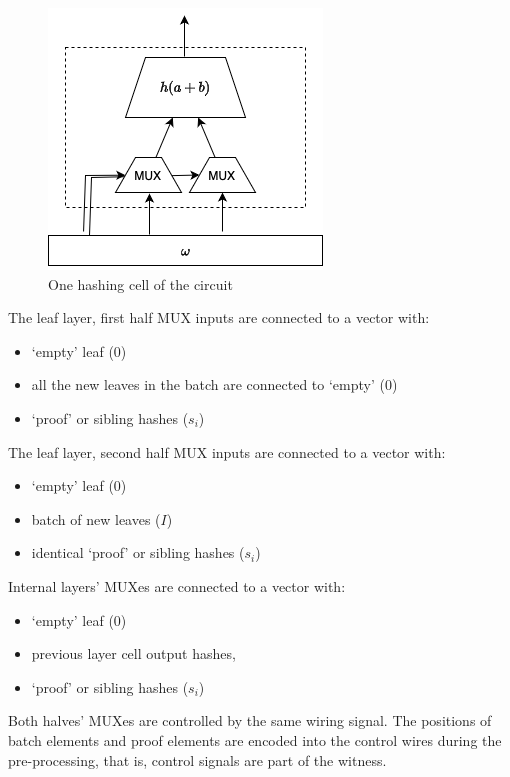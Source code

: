 \documentclass[twocolumn]{article}
\begin{document}
\begin{figure}[t]
    \centering
    \includegraphics[width=.6\columnwidth]{pic/smt-circuit-cell.drawio}
    \caption{One hashing cell of the circuit}\label{fi:smt-circuit-cell}
\end{figure}


The leaf layer, first half MUX inputs are connected to a vector with:
\begin{itemize}
    \item `empty' leaf ($0$)
    \item all the new leaves in the batch are connected to `empty' ($0$)
    \item `proof' or sibling hashes ($s_i$)
\end{itemize}

The leaf layer, second half MUX inputs are connected to a vector with:
\begin{itemize}
    \item `empty' leaf ($0$)
    \item batch of new leaves ($I$)
    \item identical `proof' or sibling hashes ($s_i$)
\end{itemize}

Internal layers' MUXes are connected to a vector with:
\begin{itemize}
    \item `empty' leaf ($0$)
    \item previous layer cell output hashes,
    \item `proof' or sibling hashes ($s_i$)
\end{itemize}

Both halves' MUXes are controlled by the same wiring signal. The positions of batch elements and proof elements are encoded into the control wires during the pre-processing, that is, control signals are part of the witness.
\end{document}
